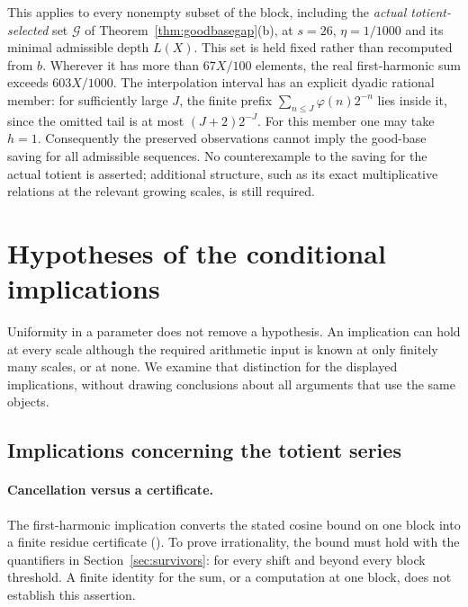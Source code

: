 This applies to every nonempty subset of the block, including the
\emph{actual totient-selected} set $\mathcal G$ of
Theorem~\ref{thm:goodbasegap}(b), at $s=26$, $\eta=1/1000$ and its
minimal admissible depth $L(X)$. This set is held fixed rather
than recomputed from $b$. Wherever it has more than $67X/100$
elements, the real first-harmonic sum exceeds $603X/1000$.
The interpolation interval has an explicit dyadic rational member: for
sufficiently large $J$, the finite prefix
$\sum_{n\le J}\varphi(n)2^{-n}$ lies inside it, since the omitted tail
is at most $(J+2)2^{-J}$. For this member one may take $h=1$.
Consequently the preserved observations cannot imply the good-base
saving for all admissible sequences. No counterexample to the saving
for the actual totient is asserted; additional structure, such as its
exact multiplicative relations at the relevant growing scales, is
still required.

\section{Hypotheses of the conditional implications}
\label{sec:promotion-audit}

Uniformity in a parameter does not remove a hypothesis. An implication
can hold at every scale although the required arithmetic input is known
at only finitely many scales, or at none. We examine that distinction
for the displayed implications, without drawing conclusions about all
arguments that use the same objects.

\subsection*{Implications concerning the totient series}

\paragraph{Cancellation versus a certificate.}
The first-harmonic implication converts the stated cosine bound on one
block into a finite residue certificate
(). To prove irrationality, the bound must hold with the
quantifiers in Section~\ref{sec:survivors}: for every shift and beyond
every block threshold. A finite identity for the sum, or a computation
at one block, does not establish this assertion.

